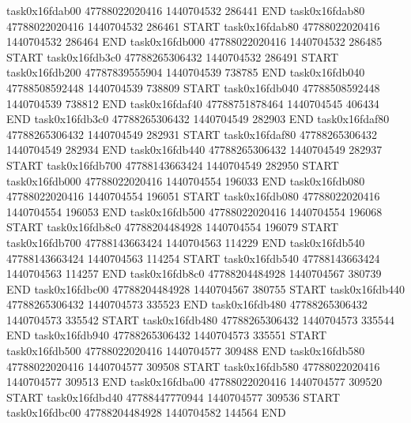 task0x16fdab00 47788022020416          1440704532               286441  END
task0x16fdab80 47788022020416          1440704532               286461  START
task0x16fdab80 47788022020416          1440704532               286464  END
task0x16fdb000 47788022020416          1440704532               286485  START
task0x16fdb3c0 47788265306432          1440704532               286491  START
task0x16fdb200 47787839555904          1440704539               738785  END
task0x16fdb040 47788508592448          1440704539               738809  START
task0x16fdb040 47788508592448          1440704539               738812  END
task0x16fdaf40 47788751878464          1440704545               406434  END
task0x16fdb3c0 47788265306432          1440704549               282903  END
task0x16fdaf80 47788265306432          1440704549               282931  START
task0x16fdaf80 47788265306432          1440704549               282934  END
task0x16fdb440 47788265306432          1440704549               282937  START
task0x16fdb700 47788143663424          1440704549               282950  START
task0x16fdb000 47788022020416          1440704554               196033  END
task0x16fdb080 47788022020416          1440704554               196051  START
task0x16fdb080 47788022020416          1440704554               196053  END
task0x16fdb500 47788022020416          1440704554               196068  START
task0x16fdb8c0 47788204484928          1440704554               196079  START
task0x16fdb700 47788143663424          1440704563               114229  END
task0x16fdb540 47788143663424          1440704563               114254  START
task0x16fdb540 47788143663424          1440704563               114257  END
task0x16fdb8c0 47788204484928          1440704567               380739  END
task0x16fdbc00 47788204484928          1440704567               380755  START
task0x16fdb440 47788265306432          1440704573               335523  END
task0x16fdb480 47788265306432          1440704573               335542  START
task0x16fdb480 47788265306432          1440704573               335544  END
task0x16fdb940 47788265306432          1440704573               335551  START
task0x16fdb500 47788022020416          1440704577               309488  END
task0x16fdb580 47788022020416          1440704577               309508  START
task0x16fdb580 47788022020416          1440704577               309513  END
task0x16fdba00 47788022020416          1440704577               309520  START
task0x16fdbd40 47788447770944          1440704577               309536  START
task0x16fdbc00 47788204484928          1440704582               144564  END
